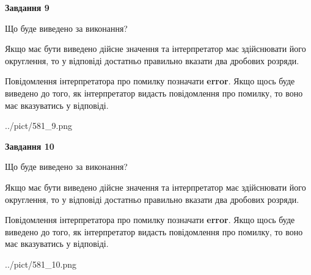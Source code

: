 \documentclass[12pt, ukrainian]{article}
\begin{document}
{\begin {Large}
{\begin {center}\textbf{Завдання 9}\end {center}}\par
Що буде виведено за виконання? \par

Якщо має бути виведено дійсне значення та інтерпретатор має здійснювати його округлення, 
то у відповіді достатньо правильно вказати два дробових розряди.

Повідомлення інтерпретатора про помилку позначати \textbf{error}.
Якщо щось буде виведено до того, як інтерпретатор видасть повідомлення про помилку, 
то воно має вказуватись у відповіді. \par

\begin{center}
	{../pict/581_9.png}
\end{center}
\newpage

{\begin {center}\textbf{Завдання 10}\end {center}}\par
Що буде виведено за виконання? \par

Якщо має бути виведено дійсне значення та інтерпретатор має здійснювати його округлення, 
то у відповіді достатньо правильно вказати два дробових розряди.

Повідомлення інтерпретатора про помилку позначати \textbf{error}.
Якщо щось буде виведено до того, як інтерпретатор видасть повідомлення про помилку, 
то воно має вказуватись у відповіді. \par

\begin{center}
	{../pict/581_10.png}
\end{center}
\newpage

\end {Large}}
\end{document}
